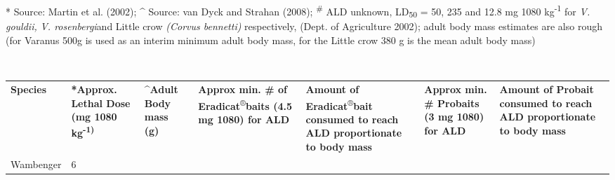 \documentclass[version=last,
    paper=a4,                               %
    10pt,                                   %
    dvipsnames,
    oneside,                              %
    headings=openany,                       %
    open=any,
    BCOR=7mm,                               %
    DIV=15,     %
]{scrbook}
\begin{document}
~

* Source: Martin et al. (2002); \^{} Source: van Dyck and Strahan
(2008); \textsuperscript{\#} ALD unknown, LD\textsubscript{50} = 50, 235
and 12.8 mg 1080 kg\textsuperscript{-1} for \emph{V. gouldii,} \emph{V.
rosenbergi}and Little crow \emph{(Corvus bennetti)} respectively, (Dept.
of Agriculture 2002); adult body mass estimates are also rough (for
Varanus 500g is used as an interim minimum adult body mass, for the
Little crow 380 g is the mean adult body mass)

~

\begin{longtable}[c]{@{}lllllll@{}}
\toprule\addlinespace
\begin{minipage}[t]{0.12\columnwidth}\raggedright
\textbf{Species}
\end{minipage} & \begin{minipage}[t]{0.12\columnwidth}\raggedright
\textbf{*Approx. Lethal Dose (mg 1080 kg\textsuperscript{-1)}}
\end{minipage} & \begin{minipage}[t]{0.12\columnwidth}\raggedright
\textbf{\^{}Adult Body mass (g)}~
\end{minipage} & \begin{minipage}[t]{0.12\columnwidth}\raggedright
\textbf{Approx min. \# of Eradicat}\textsuperscript{®}\textbf{baits (4.5
mg 1080) for ALD}
\end{minipage} & \begin{minipage}[t]{0.12\columnwidth}\raggedright
\textbf{Amount of Eradicat}\textsuperscript{®}\textbf{bait consumed to
reach ALD proportionate to body mass}
\end{minipage} & \begin{minipage}[t]{0.12\columnwidth}\raggedright
\textbf{Approx min. \# Probaits (3 mg 1080) for ALD}
\end{minipage} & \begin{minipage}[t]{0.12\columnwidth}\raggedright
\textbf{Amount of Probait consumed to reach ALD proportionate to body
mass}
\end{minipage}
\\\addlinespace
\begin{minipage}[t]{0.12\columnwidth}\raggedright
Wambenger
\end{minipage} & \begin{minipage}[t]{0.12\columnwidth}\raggedright
6
\end{minipage} & \begin{minipage}[t]{0.12\columnwidth}\raggedright

\end{minipage}
\end{longtable}
\end{document}
